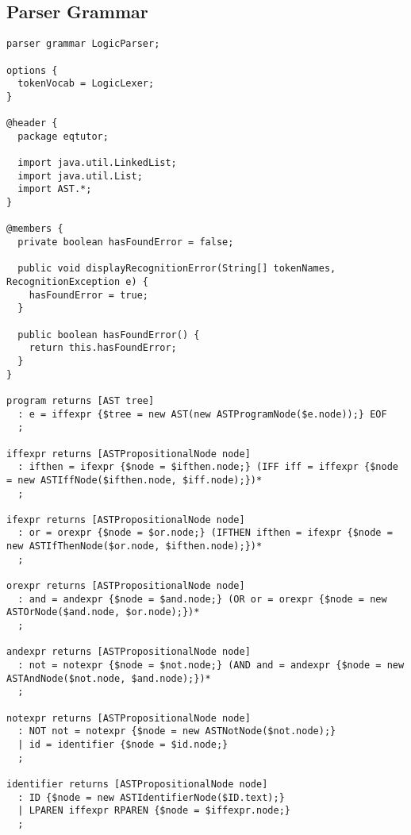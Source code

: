 \documentclass[11pt]{article}
\begin{document}
\subsection{Parser Grammar}
\begin{verbatim}
parser grammar LogicParser;

options {
  tokenVocab = LogicLexer;
}

@header {
  package eqtutor;
  
  import java.util.LinkedList;
  import java.util.List;
  import AST.*;
}

@members {
  private boolean hasFoundError = false;
  
  public void displayRecognitionError(String[] tokenNames, RecognitionException e) {
    hasFoundError = true;
  }
  
  public boolean hasFoundError() {
    return this.hasFoundError;
  }
}

program returns [AST tree]
  : e = iffexpr {$tree = new AST(new ASTProgramNode($e.node));} EOF
  ;

iffexpr returns [ASTPropositionalNode node]
  : ifthen = ifexpr {$node = $ifthen.node;} (IFF iff = iffexpr {$node = new ASTIffNode($ifthen.node, $iff.node);})*
  ;
  	
ifexpr returns [ASTPropositionalNode node]
  : or = orexpr {$node = $or.node;} (IFTHEN ifthen = ifexpr {$node = new ASTIfThenNode($or.node, $ifthen.node);})*
  ;

orexpr returns [ASTPropositionalNode node]
  : and = andexpr {$node = $and.node;} (OR or = orexpr {$node = new ASTOrNode($and.node, $or.node);})*
  ;

andexpr returns [ASTPropositionalNode node]
  : not = notexpr {$node = $not.node;} (AND and = andexpr {$node = new ASTAndNode($not.node, $and.node);})*
  ;
  
notexpr returns [ASTPropositionalNode node]
  : NOT not = notexpr {$node = new ASTNotNode($not.node);}
  | id = identifier {$node = $id.node;}
  ;

identifier returns [ASTPropositionalNode node]
  : ID {$node = new ASTIdentifierNode($ID.text);}
  | LPAREN iffexpr RPAREN {$node = $iffexpr.node;}
  ;
\end{verbatim}
\end{document}
